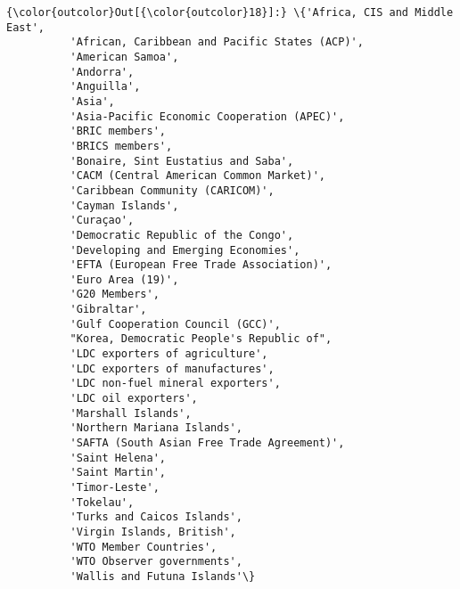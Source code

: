 \documentclass[11pt]{article}
\begin{document}
\begin{Verbatim}[commandchars=\\\{\}]
{\color{outcolor}Out[{\color{outcolor}18}]:} \{'Africa, CIS and Middle East',
          'African, Caribbean and Pacific States (ACP)',
          'American Samoa',
          'Andorra',
          'Anguilla',
          'Asia',
          'Asia-Pacific Economic Cooperation (APEC)',
          'BRIC members',
          'BRICS members',
          'Bonaire, Sint Eustatius and Saba',
          'CACM (Central American Common Market)',
          'Caribbean Community (CARICOM)',
          'Cayman Islands',
          'Curaçao',
          'Democratic Republic of the Congo',
          'Developing and Emerging Economies',
          'EFTA (European Free Trade Association)',
          'Euro Area (19)',
          'G20 Members',
          'Gibraltar',
          'Gulf Cooperation Council (GCC)',
          "Korea, Democratic People's Republic of",
          'LDC exporters of agriculture',
          'LDC exporters of manufactures',
          'LDC non-fuel mineral exporters',
          'LDC oil exporters',
          'Marshall Islands',
          'Northern Mariana Islands',
          'SAFTA (South Asian Free Trade Agreement)',
          'Saint Helena',
          'Saint Martin',
          'Timor-Leste',
          'Tokelau',
          'Turks and Caicos Islands',
          'Virgin Islands, British',
          'WTO Member Countries',
          'WTO Observer governments',
          'Wallis and Futuna Islands'\}
\end{Verbatim}
            
\end{document}
